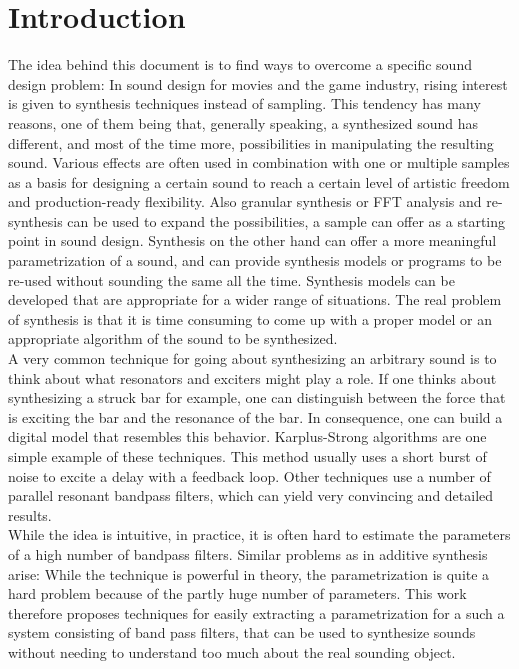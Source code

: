 \chapter{Introduction}
\label{sec:introduction}

The idea behind this document is to find ways to overcome a specific sound design problem: In sound design for movies and the game industry, rising interest is given to synthesis techniques instead of sampling. This tendency has many reasons, one of them being that, generally speaking, a synthesized sound has different, and most of the time more, possibilities in manipulating the resulting sound. Various effects are often used in combination with one or multiple  samples as a basis for designing a certain sound to reach a certain level of artistic freedom and production-ready flexibility. Also granular synthesis or FFT analysis and re-synthesis can be used to expand the possibilities, a sample can offer as a starting point in sound design. Synthesis on the other hand can offer a more meaningful parametrization of a sound, and can provide synthesis models or programs to be re-used without sounding the same all the time. Synthesis models can be developed that are appropriate for a wider range of situations. The real problem of synthesis is that it is time consuming to come up with a proper model or an appropriate algorithm of the sound to be synthesized. \\
A very common technique for going about synthesizing an arbitrary sound is to think about what resonators and exciters might play a role. If one thinks about synthesizing a struck bar for example, one can distinguish between the force that is exciting the bar and the resonance of the bar. In consequence, one can build a digital model that resembles this behavior. Karplus-Strong algorithms are one simple example of these techniques. This method usually uses a short burst of noise to excite a delay with a feedback loop. Other techniques use a number of parallel resonant bandpass filters, which can yield very convincing and detailed results. \\

While the idea is intuitive, in practice, it is often hard to estimate the parameters of a high number of bandpass filters. Similar problems as in additive synthesis arise: While the technique is powerful in theory, the parametrization is quite a hard problem because of the partly huge number of parameters. This work therefore proposes techniques for easily extracting a parametrization for a such a system consisting of band pass filters, that can be used to synthesize sounds without needing to understand too much about the real sounding object.

